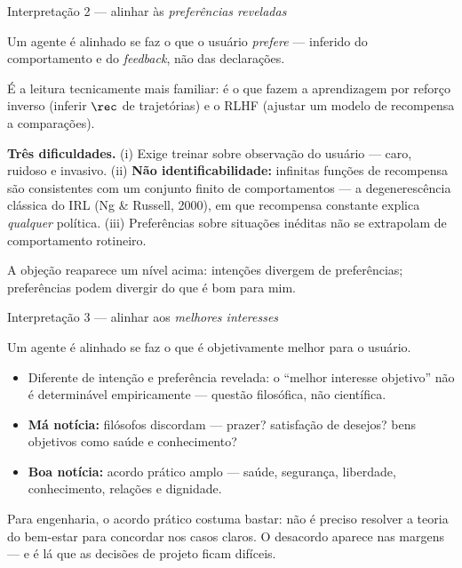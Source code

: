 \documentclass[aspectratio=169, 11pt]{beamer}
\begin{document}
\begin{frame}{Interpretação 2 --- alinhar às \emph{preferências reveladas}}
  \begin{defbox}{}
    Um agente é alinhado se faz o que o usuário \emph{prefere} --- inferido do
    comportamento e do \emph{feedback}, não das declarações.
  \end{defbox}

  {\small É a leitura tecnicamente mais familiar: é o que fazem a
  \alert{aprendizagem por reforço inverso} (inferir $\rec$ de trajetórias) e o
  \alert{RLHF} (ajustar um modelo de recompensa a comparações).}

  \begin{alertabox}
    {\small\textbf{Três dificuldades.} (i) Exige treinar sobre observação do
    usuário --- caro, ruidoso e invasivo. (ii) \textbf{Não identificabilidade:}
    infinitas funções de recompensa são consistentes com um conjunto finito de
    comportamentos --- a degenerescência clássica do IRL (Ng \& Russell, 2000),
    em que recompensa constante explica \emph{qualquer} política.
    (iii) Preferências sobre situações inéditas não se extrapolam de
    comportamento rotineiro.}
  \end{alertabox}

  \vspace{-0.3em}
  {\footnotesize A objeção reaparece um nível acima: intenções divergem de
  preferências; preferências podem divergir do que é bom para mim.}
\end{frame}

\begin{frame}{Interpretação 3 --- alinhar aos \emph{melhores interesses}}
  \begin{defbox}{}
    Um agente é alinhado se faz o que é objetivamente melhor para o usuário.
  \end{defbox}

  {\small
  \begin{itemize}\setlength{\itemsep}{0.25ex}
    \item Diferente de intenção e preferência revelada: o ``melhor interesse
          objetivo'' \alert{não é determinável empiricamente} --- questão
          filosófica, não científica.
    \item \textbf{Má notícia:} filósofos discordam --- prazer? satisfação de
          desejos? bens objetivos como saúde e conhecimento?
    \item \textbf{Boa notícia:} acordo prático amplo --- saúde, segurança,
          liberdade, conhecimento, relações e dignidade.
  \end{itemize}}

  \vspace{-0.3em}
  \begin{ideiabox}
    Para engenharia, o acordo prático costuma bastar: não é preciso resolver a
    teoria do bem-estar para concordar nos casos claros. O desacordo aparece
    nas margens --- e é lá que as decisões de projeto ficam difíceis.
  \end{ideiabox}
\end{frame}
\end{document}
